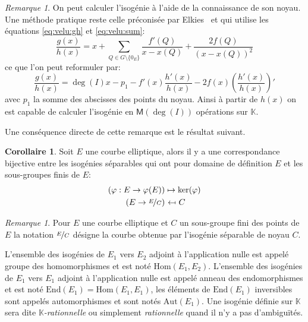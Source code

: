 \documentclass[10pt,a4paper]{book}
\theoremstyle{plain}
\theoremstyle{definition}
\theoremstyle{definition}
\theoremstyle{definition}
\newtheorem{cor}[thm]{Corollaire}
\theoremstyle{definition}
\theoremstyle{definition}
\theoremstyle{remark}
\newtheorem{rem}[thm]{Remarque}
\theoremstyle{remark}
\theoremstyle{definition}
\begin{document}
\begin{rem}
On peut calculer l'isogénie à l'aide de la connaissance de son noyau. Une méthode pratique reste celle préconisée par Elkies~\cite{Elkies1998} et \cite[Section 2.4]{Kohel96}  qui utilise les équations \eqref{eq:velu:gh} et \eqref{eq:velu:sum}:
\begin{equation*}
\frac{g(x)}{h(x)}= x + \sum_{Q \in G \setminus \{0_E\}} \frac{f'(Q)}{x-x(Q)}+\frac{2f(Q)}{(x-x(Q))^2}
\end{equation*}
ce que l'on peut reformuler par:
\begin{equation}
\frac{g(x)}{h(x)}= \deg(I) x -p_1 - f'(x) \frac{h'(x)}{h(x)} -2f(x)  \left(\frac{h'(x)}{h(x)}\right)'
\end{equation}
avec $p_1$ la somme des abscisses des points du noyau. Ainsi à partir de $h(x)$ on est capable de calculer l'isogénie en $\mathsf{M}(\deg(I))$ opérations sur $\mathbb{K}$.
\end{rem}

Une conséquence directe de cette remarque est le résultat suivant.

\begin{cor}
Soit $E$ une courbe elliptique, alors il y a une correspondance bijective entre les isogénies séparables qui ont pour domaine de définition $E$ et les sous-groupes finis de $E$:
\begin{equation*}
\begin{alignedat}{1}
(\varphi :E\rightarrow \varphi(E)) &\mapsto  \ker(\varphi)  \\
 (E\rightarrow\nicefrac{E}{C})  &\  \reflectbox{$\mapsto$} \ C 
\end{alignedat}
\end{equation*}
\end{cor}

\begin{rem}
Pour $E$ une courbe elliptique et $C$ un sous-groupe fini des points de $E$ la notation $\nicefrac{E}{C}$ désigne la courbe obtenue par l'isogénie séparable de noyau $C$.
\end{rem}

L'ensemble des isogénies de $E_1$ vers $E_2$ adjoint à l'application nulle est appelé groupe des homomorphismes et est noté \emph{$\mathrm{Hom}(E_1,E_2)$}. L'ensemble des isogénies de $E_1$ vers $E_1$ adjoint à l'application nulle est appelé anneau des endomorphismes et est noté \emph{$\mathrm{End}(E_1)=\mathrm{Hom}(E_1,E_1)$}, les éléments de $\mathrm{End}(E_1)$ inversibles sont appelés automorphismes et sont notés \emph{$\mathrm{Aut}(E_1)$}. Une isogénie définie sur $\mathbb{K}$ sera dite \emph{$\mathbb{K}$-rationnelle} ou simplement \emph{rationnelle} quand il n'y a pas d'ambiguïtés.
\end{document}
